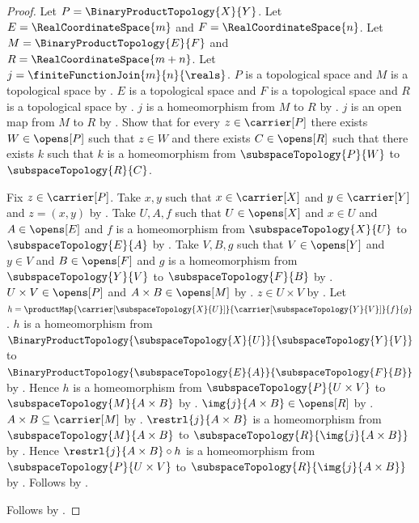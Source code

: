 \begin{proof}
    Let $P=\BinaryProductTopology{X}{Y}$.
    Let $E=\RealCoordinateSpace{m}$ and $F=\RealCoordinateSpace{n}$.
    Let $M=\BinaryProductTopology{E}{F}$ and $R=\RealCoordinateSpace{m+n}$.
    Let $j=\finiteFunctionJoin{m}{n}{\reals}$.
    $P$ is a topological space and $M$ is a topological space by
        .
    $E$ is a topological space and $F$ is a topological space and $R$ is a topological space by
        .
    $j$ is a homeomorphism from $M$ to $R$ by .
    $j$ is an open map from $M$ to $R$ by .
    Show that for every $z\in\carrier[P]$ there exists $W\in\opens[P]$ such that
        $z\in W$ and there exists $C\in\opens[R]$ such that there exists $k$ such that
        $k$ is a homeomorphism from $\subspaceTopology{P}{W}$ to $\subspaceTopology{R}{C}$.
    \begin{subproof}
        Fix $z\in\carrier[P]$.
        Take $x,y$ such that $x\in\carrier[X]$ and $y\in\carrier[Y]$ and $z=(x,y)$ by
            .
        Take $U,A,f$ such that $U\in\opens[X]$ and $x\in U$ and $A\in\opens[E]$ and
            $f$ is a homeomorphism from $\subspaceTopology{X}{U}$ to $\subspaceTopology{E}{A}$ by
            .
        Take $V,B,g$ such that $V\in\opens[Y]$ and $y\in V$ and $B\in\opens[F]$ and
            $g$ is a homeomorphism from $\subspaceTopology{Y}{V}$ to $\subspaceTopology{F}{B}$ by
            .
        $U\times V\in\opens[P]$ and $A\times B\in\opens[M]$ by
            .
        $z\in U\times V$ by .
        Let $h=\productMap{\carrier[\subspaceTopology{X}{U}]}{\carrier[\subspaceTopology{Y}{V}]}{f}{g}$.
        $h$ is a homeomorphism from
            $\BinaryProductTopology{\subspaceTopology{X}{U}}{\subspaceTopology{Y}{V}}$ to
            $\BinaryProductTopology{\subspaceTopology{E}{A}}{\subspaceTopology{F}{B}}$ by
            .
        Hence $h$ is a homeomorphism from $\subspaceTopology{P}{U\times V}$ to
            $\subspaceTopology{M}{A\times B}$ by .
        $\img{j}{A\times B}\in\opens[R]$ by .
        $A\times B\subseteq\carrier[M]$ by .
        $\restrl{j}{A\times B}$ is a homeomorphism from $\subspaceTopology{M}{A\times B}$ to
            $\subspaceTopology{R}{\img{j}{A\times B}}$ by .
        Hence $\restrl{j}{A\times B}\circ h$ is a homeomorphism from
            $\subspaceTopology{P}{U\times V}$ to $\subspaceTopology{R}{\img{j}{A\times B}}$ by
            .
        Follows by .
    \end{subproof}
    Follows by .
\end{proof}

